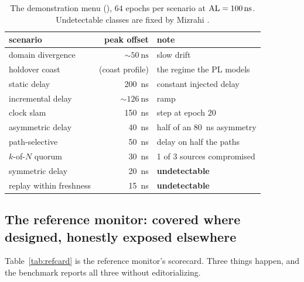 \begin{table}[t]
  \centering
  \caption{The demonstration menu (\Modelled{}), $64$ epochs per scenario at
  $\mathrm{AL}=\SI{100}{\nano\second}$. Undetectable classes are fixed by Mizrahi
  \citep{mizrahi7384}.}
  \label{tab:demomenu}
  \begin{tabular}{l r l}
    \toprule
    scenario & peak offset & note \\
    \midrule
    domain divergence        & $\sim\!\SI{50}{\nano\second}$   & slow drift \\
    holdover coast           & (coast profile)                 & the regime the PL models \\
    static delay             & \SI{200}{\nano\second}          & constant injected delay \\
    incremental delay        & $\sim\!\SI{126}{\nano\second}$  & ramp \\
    clock slam               & \SI{150}{\nano\second}          & step at epoch 20 \\
    asymmetric delay         & \SI{40}{\nano\second}           & half of an \SI{80}{\nano\second} asymmetry \\
    path-selective           & \SI{50}{\nano\second}           & delay on half the paths \\
    $k$-of-$N$ quorum        & \SI{30}{\nano\second}           & 1 of 3 sources compromised \\
    symmetric delay          & \SI{20}{\nano\second}           & \textbf{undetectable} \\
    replay within freshness  & \SI{15}{\nano\second}           & \textbf{undetectable} \\
    \bottomrule
  \end{tabular}
\end{table}

\subsection{The reference monitor: covered where designed, honestly exposed elsewhere}
\label{sec:demoref}

Table~\ref{tab:refcard} is the reference monitor's scorecard. Three things happen,
and the benchmark reports all three without editorializing.

